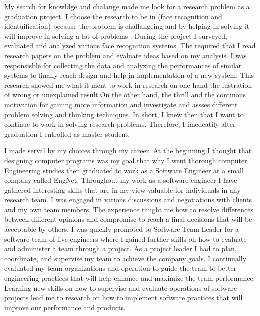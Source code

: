 \documentclass[a4paper,12pt]{article}%
\begin{document}
  My search for knowldge and chalange made me look for a research problem as a graduation project. I choose the research to be in (face recognition and identuification) because the problem is challangeing and by helping in solving it will improve in solving a lot of problems . During the project I  surveyed, evaluated and analyzed various face recognition systems. The required that I read research papers on the problem and evaluate ideas based on my analysis. I was responsisble for collecting the data and analyzing the performances of similar systems to finally reach design and help in implementation of a new system. This research showed me what it ment to work in research on one hand the fustration of wrong or unexplained result.On the other hand, the thrill and the continous motivation for gaining more information and investigate and assses different problem solving and thinking techniques. In short, I knew then that I want to continue to work in solving research problems. Therefore, I imedeatily after graduation I entrolled as master student. %
 
I made serval by my choices through my career. At the beginning I thought that designing computer programs was my goal that why I went thorough computer Engineering studies then graduated to work as a Software Engineer at a small company called EngNet. Throughout my work as a software engineer I have gathered interesting skills that are in my view valuable for individuals in any research team.  I was engaged in various discussions and negotiations with clients and my own team members. The experience taught me how to resolve differences between different opinions and compromise to reach a final decisions that will be acceptable by others. I was quickly promoted to Software Team Leader for a software team of five engineers  where I gained further skills on how to  evaluate and administer a team through a project. As a project leader I had to plan, coordinate, and  supervise my team to achieve the company goals. I continually evaluated my team organizations and operation to guide the team to better engineering practices that will help enhance and maximize the team performance.  Learning new skills on how to supervise and evaluate operations of software projects lead me to research on how to implement software practices that will improve our performance and products.  
 
\end{document}
